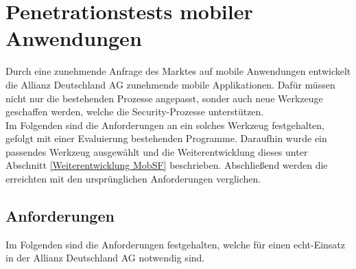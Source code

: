 \chapter{Penetrationstests mobiler Anwendungen}
Durch eine zunehmende Anfrage des Marktes auf mobile Anwendungen entwickelt die Allianz Deutschland AG zunehmende mobile Applikationen. Dafür müssen nicht nur die bestehenden Prozesse angepasst, sonder auch neue Werkzeuge geschaffen werden, welche die Security-Prozesse unterstützen.\\

Im Folgenden sind die Anforderungen an ein solches Werkzeug festgehalten, gefolgt mit einer Evaluierung bestehenden Programme. Daraufhin wurde ein passendes Werkzeug ausgewählt und die Weiterentwicklung dieses unter Abschnitt \ref{Weiterentwicklung MobSF} beschrieben. Abschließend werden die erreichten mit den ursprünglichen Anforderungen verglichen.

\section{Anforderungen}\label{ref:PenMobAnwdWeiterAnford}
Im Folgenden sind die Anforderungen festgehalten, welche für einen echt-Einsatz in der Allianz Deutschland AG notwendig sind.

